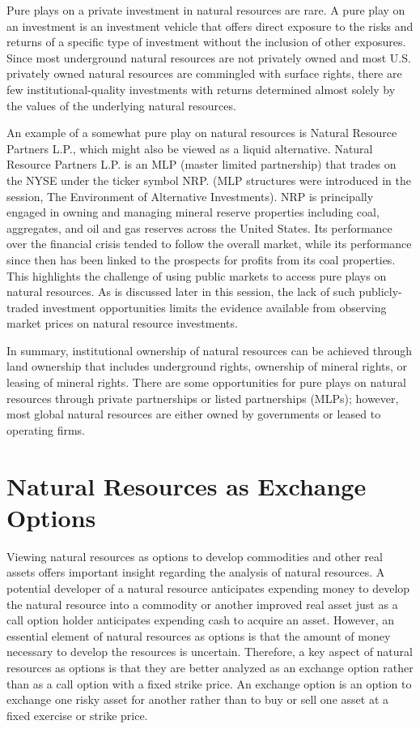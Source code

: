 \documentclass[11pt]{article}
\begin{document}
Pure plays on a private investment in natural resources are rare. A pure play on an investment is an investment vehicle that offers direct exposure to the risks and returns of a specific type of investment without the inclusion of other exposures. Since most underground natural resources are not privately owned and most U.S. privately owned natural resources are commingled with surface rights, there are few institutional-quality investments with returns determined almost solely by the values of the underlying natural resources.

An example of a somewhat pure play on natural resources is Natural Resource Partners L.P., which might also be viewed as a liquid alternative. Natural Resource Partners L.P. is an MLP (master limited partnership) that trades on the NYSE under the ticker symbol NRP. (MLP structures were introduced in the session, The Environment of Alternative Investments). NRP is principally engaged in owning and managing mineral reserve properties including coal, aggregates, and oil and gas reserves across the United States. Its performance over the financial crisis tended to follow the overall market, while its performance since then has been linked to the prospects for profits from its coal properties. This highlights the challenge of using public markets to access pure plays on natural resources. As is discussed later in this session, the lack of such publicly-traded investment opportunities limits the evidence available from observing market prices on natural resource investments.

In summary, institutional ownership of natural resources can be achieved through land ownership that includes underground rights, ownership of mineral rights, or leasing of mineral rights. There are some opportunities for pure plays on natural resources through private partnerships or listed partnerships (MLPs); however, most global natural resources are either owned by governments or leased to operating firms.

\section*{Natural Resources as Exchange Options}
Viewing natural resources as options to develop commodities and other real assets offers important insight regarding the analysis of natural resources. A potential developer of a natural resource anticipates expending money to develop the natural resource into a commodity or another improved real asset just as a call option holder anticipates expending cash to acquire an asset. However, an essential element of natural resources as options is that the amount of money necessary to develop the resources is uncertain. Therefore, a key aspect of natural resources as options is that they are better analyzed as an exchange option rather than as a call option with a fixed strike price. An exchange option is an option to exchange one risky asset for another rather than to buy or sell one asset at a fixed exercise or strike price.
\end{document}
